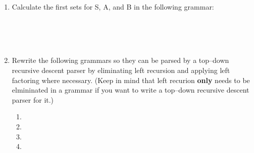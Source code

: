 \documentclass[11pt]{article}
\begin{document}

  \vspace{-3mm}

  \begin{enumerate}

    \addtolength{\itemsep}{12mm}

    \item Calculate the first sets for S, A, and B in the following grammar:

          \begin{grammar}[1.35]

              \\

              \\

              \\

          \end{grammar}

    \item Rewrite the following grammars so they can be parsed by a
          top--down recursive descent parser by eliminating left recursion
          and applying left factoring where necessary.  (Keep in mind that
          left recurion \textbf{only} needs to be elmininated in a grammar
          if you want to write a top--down recursive descent parser for it.)

          \vspace{-2.5mm}

          \begin{enumerate}

            \addtolength{\itemsep}{4mm}

            \item {}

            \item {}

            \item {}

            \item {}


\end{enumerate}
\end{enumerate}
\end{document}
